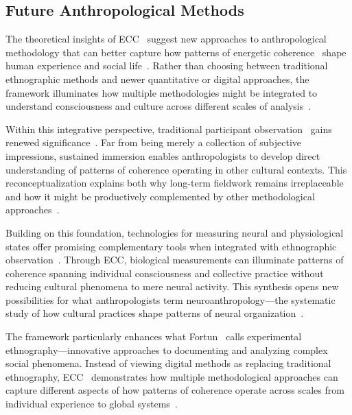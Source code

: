 \subsection*{Future Anthropological Methods}


The theoretical insights of ECC~ suggest new approaches to anthropological methodology that can better capture how patterns of energetic coherence~ shape human experience and social life~\cite{rabinow2011accompaniment, rabinow2008marking}. Rather than choosing between traditional ethnographic methods and newer quantitative or digital approaches, the framework illuminates how multiple methodologies might be integrated to understand consciousness and culture across different scales of analysis~\cite{fischer2018anthropology}.

Within this integrative perspective, traditional participant observation~ gains renewed significance~\cite{fortun2012ethnography, jackson1989paths}. Far from being merely a collection of subjective impressions, sustained immersion enables anthropologists to develop direct understanding of patterns of coherence operating in other cultural contexts. This reconceptualization explains both why long-term fieldwork remains irreplaceable and how it might be productively complemented by other methodological approaches~\cite{geertz1973interpretation}.

Building on this foundation, technologies for measuring neural and physiological states offer promising complementary tools when integrated with ethnographic observation~\cite{roepstorff2013slow, laughlin1992brain}. Through ECC, biological measurements can illuminate patterns of coherence spanning individual consciousness and collective practice without reducing cultural phenomena to mere neural activity. This synthesis opens new possibilities for what anthropologists term neuroanthropology---the systematic study of how cultural practices shape patterns of neural organization~\cite{deacon1997symbolic}.

The framework particularly enhances what Fortun~\cite{fortun2012ethnography, fortun2014latour} calls experimental ethnography---innovative approaches to documenting and analyzing complex social phenomena. Instead of viewing digital methods as replacing traditional ethnography, ECC~ demonstrates how multiple methodological approaches can capture different aspects of how patterns of coherence operate across scales from individual experience to global systems~\cite{fischer2018anthropology}.

